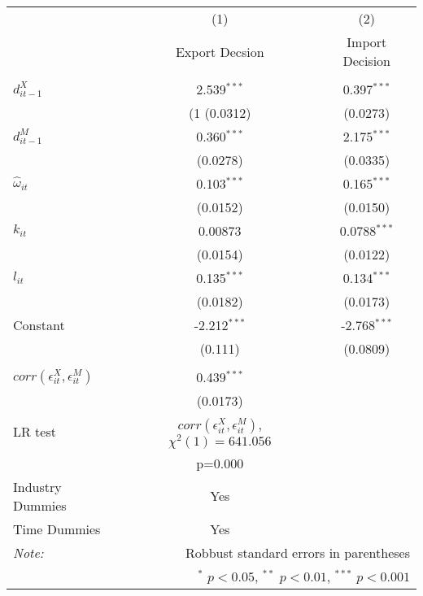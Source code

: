 \begin{center}
\begin{tabular}{l*{2}{c}}
\hline\hline
            &\multicolumn{1}{c}{(1)}&\multicolumn{1}{c}{(2)}\\
            &\multicolumn{1}{c}{Export
              Decsion}&\multicolumn{1}{c}{Import Decision}\\
\hline\\

$d_{it-1}^{X}$  &          2.539$^{***}$    &   0.397$^{***}$ \\
            &    (1    (0.0312)             &(0.0273)         \\
[1em]                                                        
$d_{it-1}^{M}$      &      0.360$^{***}$    &   2.175$^{***}$\\
            &          (0.0278)             &(0.0335)         \\
[1em]                                                        
$\hat{\omega}_{it}$  &     0.103$^{***}$     &  0.165$^{***}$\\
            &          (0.0152)             &(0.0150)         \\
[1em]                                                        
$k_{it}$       &        0.00873              & 0.0788$^{***}$\\
            &          (0.0154)             &(0.0122)         \\
[1em]                                                        
$l_{it}$     &            0.135$^{***}$     &  0.134$^{***}$\\
            &          (0.0182)             &(0.0173)         \\
[1em]                                                        
Constant      &          -2.212$^{***}$     & -2.768$^{***}$\\
            &           (0.111)             &(0.0809)         \\
\hline
\\                                                               
$corr(\epsilon_{it}^{X},\epsilon_{it}^{M}) $      &       0.439$^{***}$\\
            &    (0.0173)         \\
LR test& $corr(\epsilon_{it}^{X},\epsilon_{it}^{M})$, $\chi^{2}(1)= 641.056$&\\
& p=0.000&\\
Industry Dummies & Yes& \\
Time Dummies& Yes& \\
[1em]
\hline\hline

\textit{Note:}&\multicolumn{2}{r}{\footnotesize  Robbust standard errors in parentheses}\\
&\multicolumn{2}{r}{\footnotesize $^{*}$ \(p<0.05\), $^{**}$ \(p<0.01\), $^{***}$ \(p<0.001\)}\\
\end{tabular}
\end{center}
